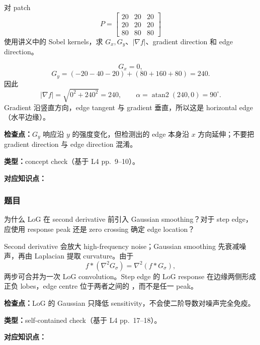 对 patch
\[
  P=\begin{bmatrix}
  20&20&20\\
  20&20&20\\
  80&80&80
  \end{bmatrix}
\]
使用讲义中的 Sobel kernels，求 $G_x,G_y$、$|\nabla f|$、gradient direction 和 edge direction。

\begin{checkedsolution}
\[
  G_x=0,
\]
\[
  G_y=(-20-40-20)+(80+160+80)=240.
\]
因此
\[
  |\nabla f|=\sqrt{0^2+240^2}=\boxed{240},\qquad
  \alpha=\operatorname{atan2}(240,0)=\boxed{90^\circ}.
\]
Gradient 沿竖直方向，edge tangent 与 gradient 垂直，所以这是 horizontal edge（水平边缘）。
\end{checkedsolution}

\textbf{检查点：}$G_y$ 响应沿 $y$ 的强度变化，但检测出的 edge 本身沿 $x$ 方向延伸；不要把 gradient direction 与 edge direction 混淆。


\textbf{类型：}concept check（基于 L4 pp.~9--10）。

\textbf{对应知识点：}

\subsubsection*{题目}

为什么 LoG 在 second derivative 前引入 Gaussian smoothing？对于 step edge，应使用 response peak 还是 zero crossing 确定 edge location？

\begin{checkedsolution}
Second derivative 会放大 high-frequency noise；Gaussian smoothing 先衰减噪声，再由 Laplacian 提取 curvature。由于
\[
  f*(\nabla^2G_\sigma)=\nabla^2(f*G_\sigma),
\]
两步可合并为一次 LoG convolution。Step edge 的 LoG response 在边缘两侧形成正负 lobes，edge centre 位于两者之间的 ，而不是任一 peak。
\end{checkedsolution}

\textbf{检查点：}LoG 的 Gaussian 只降低 sensitivity，不会使二阶导数对噪声完全免疫。


\textbf{类型：}self-contained check（基于 L4 pp.~17--18）。

\textbf{对应知识点：}

